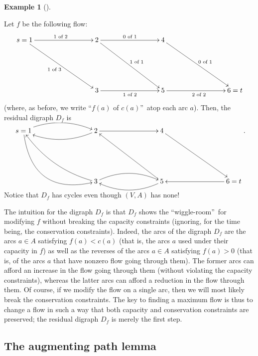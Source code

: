 \documentclass[numbers=enddot,12pt,final,onecolumn,notitlepage]{scrartcl}%
\theoremstyle{definition}
\newtheorem{exam}[theo]{Example}
\newenvironment{example}[1][]
{\begin{exam}[#1]\begin{leftbar}}
{\end{leftbar}\end{exam}}
\newcommand{\of}{\text{ of }}
\begin{document}
\begin{example}
Let $f$ be the following flow:%
\[%
\xymatrix@C=7pc@R=5pc{
s = 1 \ar[r]^{1 \of2} \ar[dr]_{1 \of3} & 2 \ar[r]^{0 \of1} \ar[dr]^{1 \of1}
& 4 \ar[dr]^{0 \of1} \\
& 3 \ar[r]_{1 \of2} & 5 \ar[r]_{2 \of2} & 6 = t
}%
\]
(where, as before, we write \textquotedblleft$f\left(  a\right)  $ of
$c\left(  a\right)  $\textquotedblright\ atop each arc $a$). Then, the
residual digraph $D_{f}$ is%
\[%
\xymatrix@C=7pc@R=5pc{
s = 1 \ar@/^1pc/[r] \ar@/_3pc/[dr] & 2 \ar[r] \ar@/^1pc/[l] & 4 \ar[dr] \\
& 3 \ar@/^1pc/[lu] \ar@/^1pc/[r] & 5 \ar@/^1pc/[l] \ar[lu] & 6 = t \ar[l]
}%
.
\]
Notice that $D_{f}$ has cycles even though $\left(  V,A\right)  $ has none!
\end{example}

The intuition for the digraph $D_{f}$ is that $D_{f}$ shows the
\textquotedblleft wiggle-room\textquotedblright\ for modifying $f$ without
breaking the capacity constraints (ignoring, for the time being, the
conservation constraints). Indeed, the arcs of the digraph $D_{f}$ are the
arcs $a\in A$ satisfying $f\left(  a\right)  <c\left(  a\right)  $ (that is,
the arcs $a$ used under their capacity in $f$) as well as the reverses of the
arcs $a\in A$ satisfying $f\left(  a\right)  >0$ (that is, of the arcs $a$
that have nonzero flow going through them). The former arcs can afford an
increase in the flow going through them (without violating the capacity
constraints), whereas the latter arcs can afford a reduction in the flow
through them. Of course, if we modify the flow on a single arc, then we will
most likely break the conservation constraints. The key to finding a maximum
flow is thus to change a flow in such a way that both capacity and
conservation constraints are preserved; the residual digraph $D_{f}$ is merely
the first step.

\subsection{The augmenting path lemma}
\end{document}
